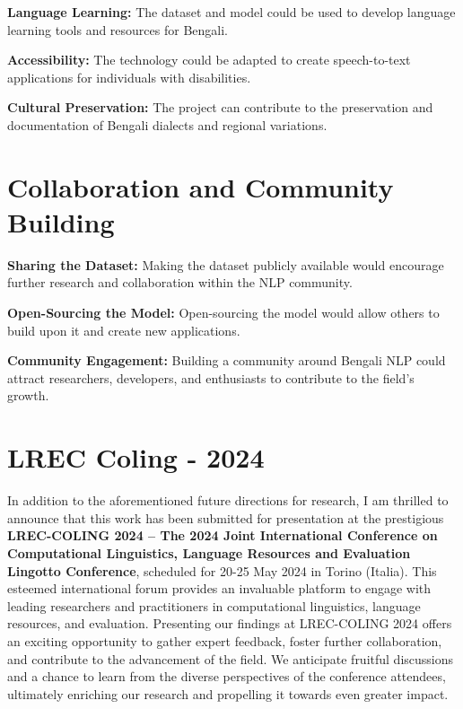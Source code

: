 \hspace{0.5cm}\textbf{Language Learning:} The dataset and model could be used to develop language learning tools and resources for Bengali.

\textbf{Accessibility:} The technology could be adapted to create speech-to-text applications for individuals with disabilities.

\textbf{Cultural Preservation:} The project can contribute to the preservation and documentation of Bengali dialects and regional variations.

\section{Collaboration and Community Building}

\hspace{0.5cm}\textbf{Sharing the Dataset:} Making the dataset publicly available would encourage further research and collaboration within the NLP community.

\textbf{Open-Sourcing the Model:} Open-sourcing the model would allow others to build upon it and create new applications.

\textbf{Community Engagement:} Building a community around Bengali NLP could attract researchers, developers, and enthusiasts to contribute to the field's growth.


\section{LREC Coling - 2024}

In addition to the aforementioned future directions for research, I am thrilled to announce that this work has been submitted for presentation at the prestigious \textbf{LREC-COLING 2024 – The 2024 Joint International Conference on Computational Linguistics, Language Resources and Evaluation Lingotto Conference}, scheduled for 20-25 May 2024 in Torino (Italia). This esteemed international forum provides an invaluable platform to engage with leading researchers and practitioners in computational linguistics, language resources, and evaluation. Presenting our findings at LREC-COLING 2024 offers an exciting opportunity to gather expert feedback, foster further collaboration, and contribute to the advancement of the field. We anticipate fruitful discussions and a chance to learn from the diverse perspectives of the conference attendees, ultimately enriching our research and propelling it towards even greater impact.
